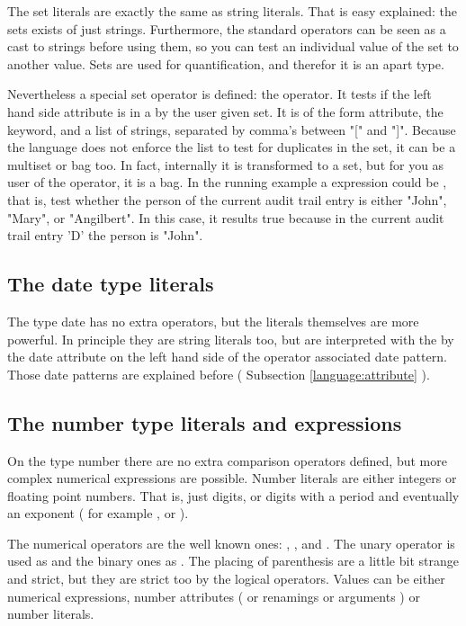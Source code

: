 The set literals are exactly the same as string literals. That is easy
explained: the sets exists of just strings. Furthermore, the standard
operators can be seen as a cast to strings before using them, so you can test
an individual value of the set to another value. Sets are used for
quantification, and therefor it is an apart type.

Nevertheless a special set operator is defined: the  operator.
\label{language:in}It
tests if the left hand side attribute is in a by the user given set. It is
of the form attribute, the  keyword, and a list of strings, separated
by comma's between
"[" and "]". Because the language does not enforce the list to test for
duplicates in the set, it can be a multiset or bag too. In fact, internally it is transformed to
a set, but for you as user of the  operator, it is a bag. In the
running example a expression could be , that is, test whether the person of the current audit trail
entry is either "John", "Mary", or "Angilbert". In this case, it results true
because in the current audit trail entry 'D' the person is "John".

\subsection{The date type literals}

The type date has no extra operators, but the literals themselves are more
powerful. In principle they are string literals too, but are interpreted with
the by the date attribute on the left hand side of the operator associated
date pattern. Those date patterns are explained before ( Subsection
\ref{language:attribute} ).

\subsection{The number type literals and expressions}

On the type number there are no extra comparison operators defined, but more
complex numerical expressions are possible. Number literals are either
integers or floating point numbers. That is, just digits, or digits with a
period and eventually an exponent ( for example ,  or
 ).

The numerical operators are the well known ones: \ltl{-}, \ltl{+}, \ltl{*} and
\ltl{/}. The unary operator \ltl{-} is used as  and the binary
ones as . The placing of parenthesis are a little
bit strange and strict, but they are strict too by the logical operators.
Values can be either numerical expressions, number attributes ( or renamings or arguments ) or
number literals.

